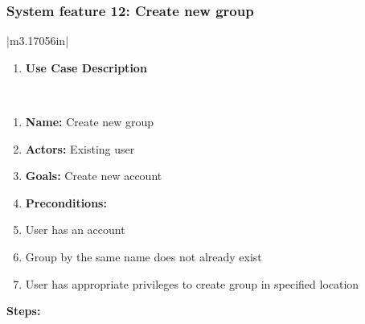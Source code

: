 \documentclass[letterpaper]{article}
\newcommand\textstyleDefaultParagraphFont[1]{#1}
\newcounter{saveenum}
\newcommand\liststyleLFOxiii{%
\renewcommand\theenumi{}
\renewcommand\labelenumi{\theenumi}
\renewcommand\labelitemi{[F0B7?]}
\renewcommand\labelitemii{o}
\renewcommand\labelitemiii{[F0A7?]}
}
\begin{document}
\subsubsection[System feature 12: Create new group]{\rmfamily System
feature 12: Create new group}
\begin{flushleft}
\tablehead{}
\begin{supertabular}{|m{3.17056in}|}
\hline
\liststyleLFOxiii
\setcounter{saveenum}{\value{enumi}}
\begin{enumerate}
\setcounter{enumi}{\value{saveenum}}
\item \sffamily\bfseries\color{black} Use Case
Description\end{enumerate}
\\\hline
\liststyleLFOxiii
\setcounter{saveenum}{\value{enumi}}
\begin{enumerate}
\setcounter{enumi}{\value{saveenum}}
\item \sffamily\color{black}
\textstyleDefaultParagraphFont{\textbf{Name:
}}\textstyleDefaultParagraphFont{Create new group}\item
\sffamily\color{black} \textstyleDefaultParagraphFont{\textbf{Actors:
}}\textstyleDefaultParagraphFont{Existing user}\item
\sffamily\color{black} \textstyleDefaultParagraphFont{\textbf{Goals:
}}\textstyleDefaultParagraphFont{Create new account}\item
\sffamily\bfseries\color{black} Preconditions: \item
\sffamily\color{black} \textstyleDefaultParagraphFont{User has an
account}\item \sffamily\color{black}
\textstyleDefaultParagraphFont{Group by the same name does not already
exist}\item \sffamily\color{black} \textstyleDefaultParagraphFont{User
has appropriate privileges to create group in specified
location}\end{enumerate}
{\sffamily\bfseries\color{black} Steps: }


\end{supertabular}
\end{flushleft}
\end{document}

